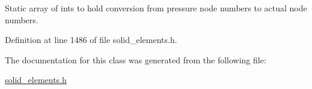 Static array of ints to hold conversion from pressure node numbers to actual node numbers. 



Definition at line 1486 of file solid\+\_\+elements.\+h.



The documentation for this class was generated from the following file\+:\begin{DoxyCompactItemize}
\item 
\hyperlink{solid__elements_8h}{solid\+\_\+elements.\+h}\end{DoxyCompactItemize}
